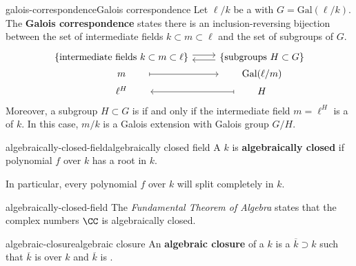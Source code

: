 \begin{topic}{galois-correspondence}{Galois correspondence}
    Let $\ell/k$ be a  with  $G = \text{Gal}(\ell/k)$. The \textbf{Galois correspondence} states there is an inclusion-reversing bijection between the set of intermediate fields $k \subset m \subset \ell$ and the set of subgroups of $G$.
    \[ \begin{tikzcd}[row sep=0em]
        \{ \text{intermediate fields } k \subset m \subset \ell \} \arrow[shift left=0.25em]{r} & \arrow[shift left=0.25em]{l} \{ \text{subgroups } H \subset G \} \\
        \qquad m \qquad  \arrow[mapsto]{r} & \qquad \text{Gal}(\ell/m) \qquad \\
        \qquad \ell^H \qquad & \arrow[mapsto]{l} \qquad H \qquad 
    \end{tikzcd} \]
    Moreover, a subgroup $H \subset G$ is  if and only if the intermediate field $m = \ell^H$ is a  of $k$. In this case, $m/k$ is a Galois extension with Galois group $G/H$.
\end{topic}

\begin{topic}{algebraically-closed-field}{algebraically closed field}
    A  $k$ is \textbf{algebraically closed} if polynomial $f$ over $k$ has a root in $k$.
    
    In particular, every polynomial $f$ over $k$ will split completely in $k$.
\end{topic}

\begin{example}{algebraically-closed-field}
    The \textit{Fundamental Theorem of Algebra} states that the complex numbers $\CC$ is algebraically closed.
\end{example}

\begin{topic}{algebraic-closure}{algebraic closure}
    An \textbf{algebraic closure} of a  $k$ is a  $\overline{k} \supset k$ such that $\overline{k}$ is  over $k$ and $\overline{k}$ is .
\end{topic}


